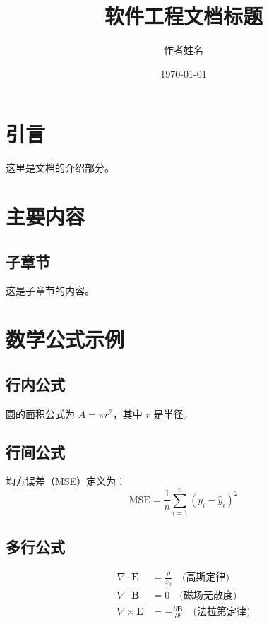 \documentclass{article}
\title{软件工程文档标题}
\author{作者姓名}
\date{\today}
\begin{document}
\maketitle

\tableofcontents
\newpage

\section{引言}
这里是文档的介绍部分。

\section{主要内容}

\subsection{子章节}
这是子章节的内容。

\section{数学公式示例}
\label{sec:math}

\subsection{行内公式}
圆的面积公式为 $A = \pi r^2$，其中 $r$ 是半径。

\subsection{行间公式}
均方误差（MSE）定义为：
\begin{equation}
    \text{MSE} = \frac{1}{n} \sum_{i=1}^{n} (y_i - \hat{y}_i)^2
    \label{eq:mse}
\end{equation}

\subsection{多行公式}
\begin{align}
    \nabla \cdot \mathbf{E} &= \frac{\rho}{\varepsilon_0} \quad \text{(高斯定律)} \\
    \nabla \cdot \mathbf{B} &= 0 \quad \text{(磁场无散度)} \\
    \nabla \times \mathbf{E} &= -\frac{\partial \mathbf{B}}{\partial t} \quad \text{(法拉第定律)}
    \label{eq:maxwell}
\end{align}
\end{document}
